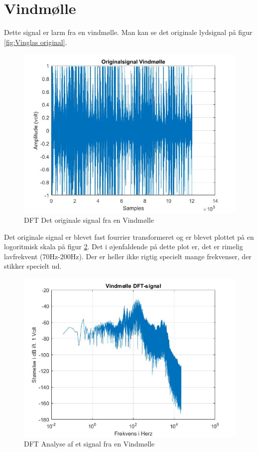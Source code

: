 \section{Vindmølle}
Dette signal er larm fra en vindmølle. Man kan se det originale lydsignal på figur \ref{fig:Vinglas original}.
\begin{figure}[H]
	\centering
	\includegraphics[width=140mm]{figures/Vind/original.jpg}
	\caption{DFT Det originale signal fra en Vindmølle}
	\label{fig:Vind original}
\end{figure}

Det originale signal er blevet fast fourrier transformeret og er blevet plottet på en logoritmisk skala på figur \ref{fig:Vind DFT}. Det i øjenfaldende på dette plot er, det er rimelig lavfrekvent (70Hz-200Hz). Der er heller ikke rigtig specielt mange frekvenser, der stikker specielt ud.
\begin{figure}[H]
	\centering
	\includegraphics[width=140mm]{figures/Vind/DFT.jpg}
	\caption{DFT Analyse af et signal fra en Vindmølle}
	\label{fig:Vind DFT}
\end{figure}

